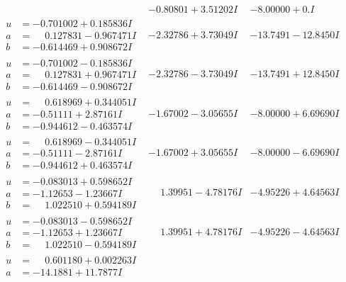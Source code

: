 \documentclass[1p]{elsarticle_modified}
\theoremstyle{definition}
\begin{document}
$$\begin{array}{c|c|c}
 & -0.80801 + 3.51202 I & -8.00000 + 0. I\phantom{ +0.000000I} \\ \hline\begin{aligned}
u &= -0.701002 + 0.185836 I \\
a &= \phantom{-}0.127831 - 0.967471 I \\
b &= -0.614469 + 0.908672 I\end{aligned}
 & -2.32786 + 3.73049 I & -13.7491 - 12.8450 I \\ \hline\begin{aligned}
u &= -0.701002 - 0.185836 I \\
a &= \phantom{-}0.127831 + 0.967471 I \\
b &= -0.614469 - 0.908672 I\end{aligned}
 & -2.32786 - 3.73049 I & -13.7491 + 12.8450 I \\ \hline\begin{aligned}
u &= \phantom{-}0.618969 + 0.344051 I \\
a &= -0.51111 + 2.87161 I \\
b &= -0.944612 - 0.463574 I\end{aligned}
 & -1.67002 - 3.05655 I & -8.00000 + 6.69690 I \\ \hline\begin{aligned}
u &= \phantom{-}0.618969 - 0.344051 I \\
a &= -0.51111 - 2.87161 I \\
b &= -0.944612 + 0.463574 I\end{aligned}
 & -1.67002 + 3.05655 I & -8.00000 - 6.69690 I \\ \hline\begin{aligned}
u &= -0.083013 + 0.598652 I \\
a &= -1.12653 - 1.23667 I \\
b &= \phantom{-}1.022510 + 0.594189 I\end{aligned}
 & \phantom{-}1.39951 - 4.78176 I & -4.95226 + 4.64563 I \\ \hline\begin{aligned}
u &= -0.083013 - 0.598652 I \\
a &= -1.12653 + 1.23667 I \\
b &= \phantom{-}1.022510 - 0.594189 I\end{aligned}
 & \phantom{-}1.39951 + 4.78176 I & -4.95226 - 4.64563 I \\ \hline\begin{aligned}
u &= \phantom{-}0.601180 + 0.002263 I \\
a &= -14.1881 + 11.7877 I \\

\end{aligned}
\end{array}$$
\end{document}
